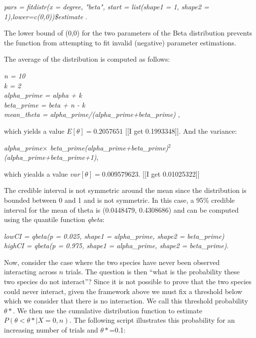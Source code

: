 \documentclass[12pt]{article}
\begin{document}
\vspace{12pt}
\noindent\emph{    pars = fitdistr(x = degree, "beta", start = list(shape1 = 1, shape2 = 1),lower=c(0,0))\$estimate }.
  \vspace{12pt}

The lower bound of (0,0) for the two parameters of the Beta distribution prevents the function from attempting to fit invalid (negative) parameter estimations.

The average of the distribution is computed as follows:

  \vspace{12pt}
\noindent
\emph{
    \noindent n = 10
    \\\noindent k = 2
    \\\noindent alpha\_prime = alpha + k
    \\\noindent beta\_prime = beta + n - k
    \\\noindent mean\_theta = alpha\_prime/(alpha\_prime+beta\_prime)
},
  \vspace{12pt}


which yields a value $E[\theta]=0.2057651$ [[I get 0.1993348]]. And the variance:

  \vspace{12pt}
\noindent\emph{alpha\_prime$\times$ beta\_prime\/(alpha\_prime+beta\_prime)$^2$\/(alpha\_prime+beta\_prime+1)},
  \vspace{12pt}


which yiealds a value $var[\theta] = 0.009579623$. [[I get 0.01025322]]

The credible interval is not symmetric around the mean since the distribution is bounded between 0 and 1 and is not symmetric. In this case, a 95\% credible interval for the mean of theta is (0.0448479, 0.4308686) and can be computed using the quantile function \emph{qbeta}:

  \vspace{12pt}
\noindent\emph{
    \noindent lowCI = qbeta(p = 0.025, shape1 = alpha\_prime, shape2 = beta\_prime)
    \\\noindent highCI = qbeta(p = 0.975, shape1 = alpha\_prime, shape2 = beta\_prime)}.
  \vspace{12pt}

Now, consider the case where the two species have never been observed interacting across $n$ trials. The question is then ``what is the probability these two species do not interact''? Since it is not possible to prove that the two species could never interact, given the framework above we must fix a threshold below which we consider that there is no interaction. We call this threshold probability $\theta*$. We then use the cumulative distribution function to estimate $P(\theta<\theta*|X=0,n)$. The following script illustrates this probability for an increasing number of trials and $\theta*$=0.1:
\end{document}
